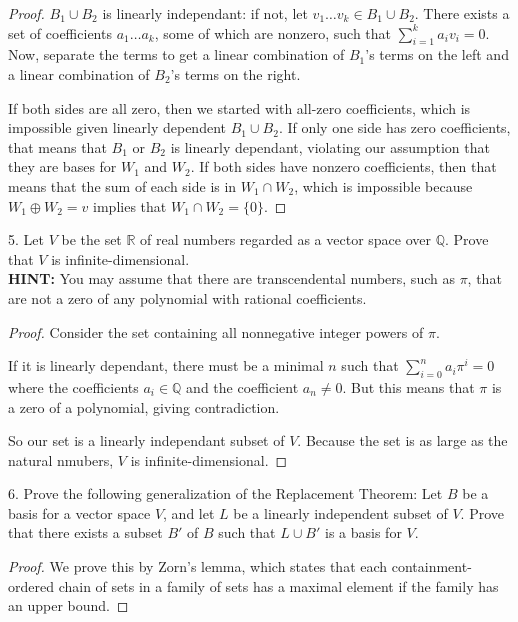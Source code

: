 \documentclass[12pt]{article} %
\newcommand{\Q}{\mathbb{Q}}
\newcommand{\R}{\mathbb{R}}
\begin{document}
\begin{flushleft}
\begin{proof}
  $B_1 \cup B_2$ is linearly independant: if not, let $v_1\ldots v_k\in B_1 \cup B_2$. There exists a set of coefficients $a_1 \ldots a_k$, some of which are nonzero, such that $\sum_{i=1}^k a_i v_i = 0$. Now, separate the terms to get a linear combination of $B_1$'s terms on the left and a linear combination of $B_2$'s terms on the right.

  If both sides are all zero, then we started with all-zero coefficients, which is impossible given linearly dependent $B_1\cup B_2$. If only one side has zero coefficients, that means that $B_1$ or $B_2$ is linearly dependant, violating our assumption that they are bases for $W_1$ and $W_2$. If both sides have nonzero coefficients, then that means that the sum of each side is in $W_1 \cap W_2$, which is impossible because $W_1 \oplus W_2 = v$ implies that $W_1 \cap W_2 = \{0\}$.
\end{proof}

\vspace{.5cm}

5.  Let $V$ be the set $\R$ of real numbers regarded as a vector space over $\Q$.  Prove that $V$ is infinite-dimensional.\\
\textbf{HINT:} You may assume that there are transcendental numbers, such as $\pi$, that are not a zero of any polynomial with rational coefficients.\\

\begin{proof}
  Consider the set containing all nonnegative integer powers of $\pi$.

  If it is linearly dependant, there must be a minimal $n$ such that $\sum_{i=0}^n a_i \pi^i = 0$ where the coefficients $a_i\in \Q$ and the coefficient $a_n \neq 0$. But this means that $\pi$ is a zero of a polynomial, giving contradiction.

  So our set is a linearly independant subset of $V$. Because the set is as large as the natural nmubers, $V$ is infinite-dimensional.
\end{proof}


\vspace{.5cm}

6.  Prove the following generalization of the Replacement Theorem: Let $B$ be a basis for a vector space $V$, and let $L$ be a linearly independent subset of $V$.  Prove that there exists a subset $B'$ of $B$ such that $L \cup B'$ is a basis for $V$.

\begin{proof}
  We prove this by Zorn's lemma, which states that each containment-ordered chain of sets in a family of sets has a maximal element if the family has an upper bound.


\end{proof}
\end{flushleft}
\end{document}
